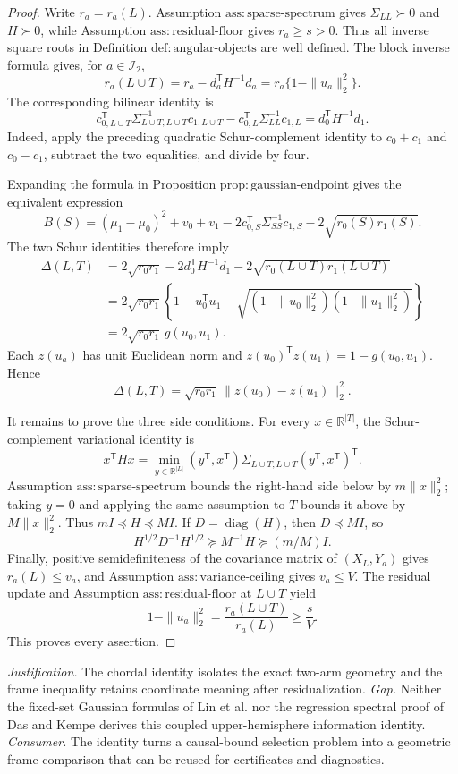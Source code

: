 \documentclass{article}
\begin{document}
\begin{proof}
Write \(r_a=r_a(L)\). Assumption \(\mathrm{ass{:}sparse\text{-}spectrum}\) gives \(\Sigma_{LL}\succ0\) and \(H\succ0\), while Assumption \(\mathrm{ass{:}residual\text{-}floor}\) gives \(r_a\ge s>0\). Thus all inverse square roots in Definition \(\mathrm{def{:}angular\text{-}objects}\) are well defined. The block inverse formula gives, for \(a\in\mathcal I_2\),
\[
 r_a(L\cup T)=r_a-d_a^{\mathsf T}H^{-1}d_a
 =r_a\{1-\|u_a\|_2^2\}.
\]
The corresponding bilinear identity is
\[
 c_{0,L\cup T}^{\mathsf T}\Sigma_{L\cup T,L\cup T}^{-1}c_{1,L\cup T}
 -c_{0,L}^{\mathsf T}\Sigma_{LL}^{-1}c_{1,L}
 =d_0^{\mathsf T}H^{-1}d_1.
\]
Indeed, apply the preceding quadratic Schur-complement identity to \(c_0+c_1\) and \(c_0-c_1\), subtract the two equalities, and divide by four.

Expanding the formula in Proposition \(\mathrm{prop{:}gaussian\text{-}endpoint}\) gives the equivalent expression
\[
 B(S)=(\mu_1-\mu_0)^2+v_0+v_1
 -2c_{0,S}^{\mathsf T}\Sigma_{SS}^{-1}c_{1,S}
 -2\sqrt{r_0(S)r_1(S)}.
\]
The two Schur identities therefore imply
\[
\begin{aligned}
 \Delta(L,T)
 &=2\sqrt{r_0r_1}-2d_0^{\mathsf T}H^{-1}d_1
   -2\sqrt{r_0(L\cup T)r_1(L\cup T)}\\
 &=2\sqrt{r_0r_1}\left\{1-u_0^{\mathsf T}u_1
 -\sqrt{(1-\|u_0\|_2^2)(1-\|u_1\|_2^2)}\right\}\\
 &=2\sqrt{r_0r_1}\,g(u_0,u_1).
\end{aligned}
\]
Each \(z(u_a)\) has unit Euclidean norm and \(z(u_0)^{\mathsf T}z(u_1)=1-g(u_0,u_1)\). Hence
\[
 \Delta(L,T)=\sqrt{r_0r_1}\,\|z(u_0)-z(u_1)\|_2^2.
\]

It remains to prove the three side conditions. For every \(x\in\mathbb R^{|T|}\), the Schur-complement variational identity is
\[
 x^{\mathsf T}Hx
 =\min_{y\in\mathbb R^{|L|}}
 (y^{\mathsf T},x^{\mathsf T})
 \Sigma_{L\cup T,L\cup T}(y^{\mathsf T},x^{\mathsf T})^{\mathsf T}.
\]
Assumption \(\mathrm{ass{:}sparse\text{-}spectrum}\) bounds the right-hand side below by \(m\|x\|_2^2\); taking \(y=0\) and applying the same assumption to \(T\) bounds it above by \(M\|x\|_2^2\). Thus \(mI\preceq H\preceq MI\). If \(D=\operatorname{diag}(H)\), then \(D\preceq MI\), so
\[
 H^{1/2}D^{-1}H^{1/2}\succeq M^{-1}H\succeq(m/M)I.
\]
Finally, positive semidefiniteness of the covariance matrix of \((X_L,Y_a)\) gives \(r_a(L)\le v_a\), and Assumption \(\mathrm{ass{:}variance\text{-}ceiling}\) gives \(v_a\le V\). The residual update and Assumption \(\mathrm{ass{:}residual\text{-}floor}\) at \(L\cup T\) yield
\[
 1-\|u_a\|_2^2
 =\frac{r_a(L\cup T)}{r_a(L)}
 \ge\frac{s}{V}.
\]
This proves every assertion.
\end{proof}
\par\smallskip\noindent \textit{Justification.} The chordal identity isolates the exact two-arm geometry and the frame inequality retains coordinate meaning after residualization. \textit{Gap.} Neither the fixed-set Gaussian formulas of Lin et al. nor the regression spectral proof of Das and Kempe derives this coupled upper-hemisphere information identity. \textit{Consumer.} The identity turns a causal-bound selection problem into a geometric frame comparison that can be reused for certificates and diagnostics.
\end{document}
